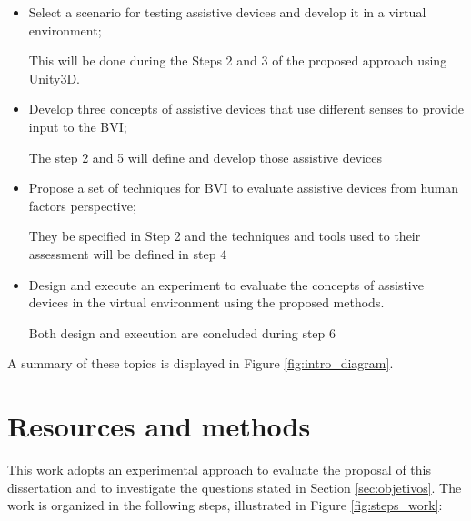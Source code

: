  \begin{itemize}
     \item Select a scenario for testing assistive devices and develop it in a virtual environment; \label{itm:subobj_first}
     
     This will be done during the Steps 2 and 3 of the proposed approach using Unity3D.

     \item Develop three concepts of assistive devices that use different senses to provide input to the BVI; \label{itm:subobj_second}
     
     The step 2 and 5 will define and develop those assistive devices

     \item Propose a set of techniques for BVI to evaluate assistive devices from human factors perspective; \label{itm:subobj_third}
     
    They be specified in Step 2 and the techniques and tools used to their assessment will be defined in step 4

     \item Design and execute an experiment to evaluate the concepts of assistive devices in the virtual environment using the proposed  methods. \label{itm:subobj_forth}
    
    Both design and execution are concluded during step 6

 \end{itemize}

 A summary of these topics is displayed in Figure \ref{fig:intro_diagram}.     

 

\section{Resources and methods} 

This work adopts an experimental approach to evaluate the proposal of this dissertation and to investigate the questions stated in Section \ref{sec:objetivos}. 
The work is organized in the following steps, illustrated in Figure \ref{fig:steps_work}:

